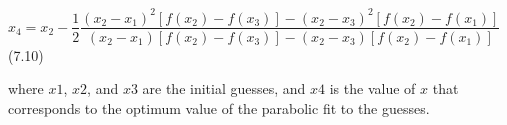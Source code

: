 \documentclass[../main.tex]{subfiles}
\begin{document}
\medskip

$x_4 = x_2 - \dfrac{1}{2}\dfrac{(x_2-x_1)^2[f(x_2)-f(x_3)]-(x_2-x_3)^2[f(x_2)-f(x_1)]}{(x_2-x_1)[f(x_2)-f(x_3)]-(x_2-x_3)[f(x_2)-f(x_1)]} $ \hfill {(7.10)}
\medskip

\noindent where $x1$, $x2$, and $x3$ are the initial guesses, and $x4$ is the value of $x$ that corresponds to the
optimum value of the parabolic fit to the guesses.
\end{document}
